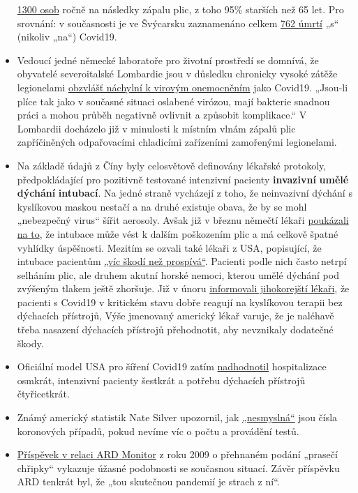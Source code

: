 \begin{itemize}
  \href{https://www.nzz.ch/lungenentzuendung-1.4550285}{1300 osob} ročně
  na následky zápalu plic, z toho 95\% starších než 65 let. Pro
  srovnání: v současnosti je ve Švýcarsku zaznamenáno celkem
  \href{https://www.corona-data.ch/}{762 úmrtí} „s`` (nikoliv „na``)
  Covid19.
\item
  Vedoucí jedné německé laboratoře pro životní prostředí se domnívá, že
  obyvatelé severoitalské Lombardie jsou v důsledku chronicky vysoké
  zátěže legionelami
  \href{https://m.apotheke-adhoc.de/nachrichten/detail/coronavirus/erhoehen-legionellen-die-todesrate-einer-corona-infektion/}{obzvlášť
  náchylní k virovým onemocněním} jako Covid19. „Jsou-li plíce tak jako
  v současné situaci oslabené virózou, mají bakterie snadnou práci a
  mohou průběh negativně ovlivnit a způsobit komplikace.`` V Lombardii
  docházelo již v minulosti k místním vlnám zápalů plic zapříčiněných
  odpařovacími chladicími zařízeními zamořenými legionelami.
\item
  Na základě údajů z Číny byly celosvětově definovány lékařské
  protokoly, předpokládající pro pozitivně testované intenzivní pacienty
  \textbf{invazivní} \textbf{umělé dýchání} \textbf{intubací}. Na jedné
  straně vycházejí z toho, že neinvazivní dýchání s kyslíkovou maskou
  nestačí a na druhé existuje obava, že by se mohl „nebezpečný virus``
  šířit aerosoly. Avšak již v březnu němečtí lékaři
  \href{https://www.doccheck.com/de/detail/articles/26271-covid-19-beatmung-und-dann}{poukázali
  na to}, že intubace může vést k dalším poškozením plic a má celkově
  špatné vyhlídky úspěšnosti. Mezitím se ozvali také lékaři z USA,
  popisující, že intubace pacientům
  \href{https://www.youtube.com/watch?v=k9GYTc53r2o}{„víc škodí než
  prospívá``}. Pacienti podle nich často netrpí selháním plic, ale
  druhem akutní horské nemoci, kterou umělé dýchání pod zvýšeným tlakem
  ještě zhoršuje. Již v únoru
  \href{https://www.upi.com/Top_News/World-News/2020/02/14/Oxygen-therapy-working-for-coronavirus-patient-Seoul-says/6651581696794/}{informovali
  jihokorejští lékaři}, že pacienti s Covid19 v kritickém stavu dobře
  reagují na kyslíkovou terapii bez dýchacích přístrojů, Výše jmenovaný
  americký lékař varuje, že je naléhavě třeba nasazení dýchacích
  přístrojů přehodnotit, aby nevznikaly dodatečné škody.
\item
  Oficiální model USA pro šíření Covid19 zatím
  \href{https://twitter.com/NikolovScience/status/1246823479820693505}{nadhodnotil}
  hospitalizace osmkrát, intenzivní pacienty šestkrát a potřebu
  dýchacích přístrojů čtyřicetkrát.
\item
  Známý americký statistik Nate Silver upozornil, jak
  \href{https://fivethirtyeight.com/features/coronavirus-case-counts-are-meaningless/}{„nesmyslná``}
  jsou čísla koronových případů, pokud nevíme víc o počtu a provádění
  testů.
\item
  \href{https://www.youtube.com/watch?v=EpSdCh1KT1A}{Příspěvek v relaci
  ARD Monitor} z roku 2009 o přehnaném podání „prasečí chřipky``
  vykazuje úžasné podobnosti se současnou situací. Závěr příspěvku ARD
  tenkrát byl, že „tou skutečnou pandemií je strach z ní``.
\end{itemize}

